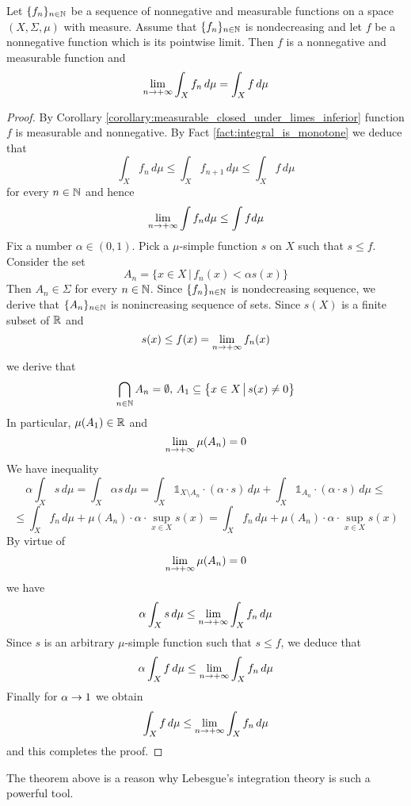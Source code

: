 \documentclass[10pt]{amsart}
\begin{document}
\begin{theorem}\label{theorem:monotone_convergence}
	Let $\{f_n\}_{n\in {\mathbb N}}$ be a sequence of nonnegative and measurable functions on a space $(X,\Sigma,\mu)$ with measure. Assume that $\{f_n\}_{n\in {\mathbb N}}$ is nondecreasing and let $f$ be a nonnegative function which is its pointwise limit. Then $f$ is a nonnegative and measurable function and
	$$\lim_{n\rightarrow +\infty}\int_X f_n\, d\mu = \int_X f\, d\mu$$
\end{theorem}
\begin{proof}
	By Corollary \ref{corollary:measurable_closed_under_limes_inferior} function $f$ is measurable and nonnegative. By Fact \ref{fact:integral_is_monotone} we deduce that
	$$\int_X f_n\,d\mu \leq \int_X f_{n+1}\,d\mu \leq \int_X f\, d\mu$$
	for every $n\in {\mathbb N}$ and hence
	$$\lim_{n\rightarrow +\infty}\int f_n d\mu \leq \int f d\mu$$
	Fix a number $\alpha \in (0,1)$. Pick a $\mu$-simple function $s$ on $X$ such that $s\leq f$. Consider the set
	$$A_n = \big\{x\in X\,\big|\, f_n(x)< \alpha s(x)\big\}$$
	Then $A_n\in \Sigma$ for every $n\in {\mathbb N}$. Since $\{f_n\}_{n\in {\mathbb N}}$ is nondecreasing sequence, we derive that $\{A_n\}_{n\in {\mathbb N}}$ is nonincreasing sequence of sets. Since $s(X)$ is a finite subset of ${\mathbb R}$ and
	$$s(x)\leq f(x) = \lim_{n\rightarrow +\infty}f_n(x)$$
	we derive that
	$$\bigcap_{n\in {\mathbb N}}A_n = \emptyset,\,A_1\subseteq \big\{x\in X\,\big|\,s(x)\neq 0\big\}$$
	In particular, $\mu(A_1) \in {\mathbb R}$ and
	$$\lim_{n\rightarrow +\infty}\mu(A_n)=0$$
	We have inequality
	$$\alpha  \int_Xs\,d\mu = \int_X\alpha s\,d\mu = \int_X  \mathbb{1}_{X\setminus A_n}\cdot \left(\alpha \cdot s\right)\,d\mu +  \int_X \mathbb{1}_{A_n}\cdot \left(\alpha \cdot s\right)\,d\mu \leq $$
	$$\leq \int_X f_n\,d\mu + \mu(A_n)\cdot \alpha \cdot \sup_{x\in X}s(x) = \int_X f_n\,d\mu + \mu(A_n)\cdot \alpha \cdot \sup_{x\in X}s(x)$$
	By virtue of
	$$\lim_{n\rightarrow +\infty} \mu(A_n) = 0$$
	we have
	$$\alpha  \int_Xs\,d\mu \leq \lim_{n\rightarrow +\infty}\int_Xf_n\,d\mu$$
	Since $s$ is an arbitrary $\mu$-simple function such that $s\leq f$, we deduce that
	$$\alpha  \int_Xf\,d\mu \leq \lim_{n\rightarrow +\infty}\int_Xf_n\,d\mu$$
	Finally for $\alpha \rightarrow 1$ we obtain
	$$\int_Xf\,d\mu \leq  \lim_{n\rightarrow +\infty}\int_Xf_n\,d\mu$$
	and this completes the proof.
\end{proof}
\noindent
The theorem above is a reason why Lebesgue's integration theory is such a powerful tool.
\end{document}
